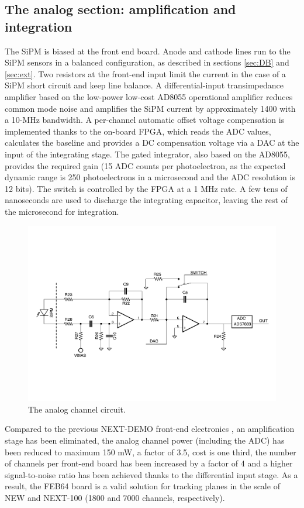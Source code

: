 \subsection{The analog section: amplification and integration}\label{sec:analog}
The SiPM is biased at the front end board. Anode and cathode lines run to the SiPM sensors in a balanced configuration, as described in sections \ref{sec:DB} and \ref{sec:ext}. Two resistors at the front-end input limit the current in the case of a SiPM short circuit and keep line balance.
A differential-input transimpedance amplifier based on the low-power low-cost AD8055 operational amplifier reduces common mode noise and amplifies the SiPM current by approximately 1400 with a 10-MHz bandwidth. A per-channel automatic offset voltage compensation is implemented thanks to the on-board FPGA, which reads the ADC values, calculates the baseline and provides a DC compensation voltage via a DAC at the input of the integrating stage.
The gated integrator, also based on the AD8055, provides the required gain (15 ADC counts per photoelectron, as the expected dynamic range is 250 photoelectrons in a microsecond and the ADC resolution is 12 bits). The switch is controlled by the FPGA at a 1 MHz rate. A few tens of nanoseconds are used to discharge the integrating capacitor, leaving the rest of the microsecond for integration.

\begin{figure}[h!]
\centering
\includegraphics[width=.8\textwidth]{IMG/Analog.pdf}
\caption{The analog channel circuit.}
\label{fig:analog}
\end{figure}

Compared to the previous NEXT-DEMO front-end electronics \cite{Herrero:2012sa}, an amplification stage has been eliminated, the analog channel power (including the ADC) has been reduced to maximum 150 mW, a factor of 3.5, cost is one third, the number of channels per front-end board has been increased by a factor of 4 and a higher signal-to-noise ratio has been achieved thanks to the differential input stage. As a result, the FEB64 board is a valid solution for tracking planes in the scale of NEW and NEXT-100 (1800 and 7000 channels, respectively).


